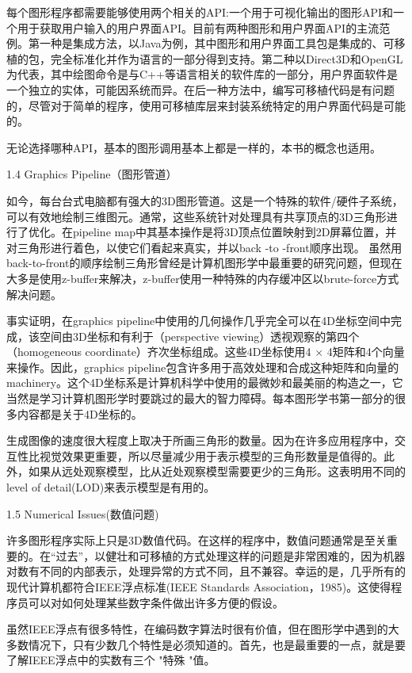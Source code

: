 每个图形程序都需要能够使用两个相关的API:一个用于可视化输出的图形API和一个用于获取用户输入的用户界面API。目前有两种图形和用户界面API的主流范例。第一种是集成方法，以Java为例，其中图形和用户界面工具包是集成的、可移植的包，完全标准化并作为语言的一部分得到支持。第二种以Direct3D和OpenGL为代表，其中绘图命令是与C++等语言相关的软件库的一部分，用户界面软件是一个独立的实体，可能因系统而异。在后一种方法中，编写可移植代码是有问题的，尽管对于简单的程序，使用可移植库层来封装系统特定的用户界面代码是可能的。

无论选择哪种API，基本的图形调用基本上都是一样的，本书的概念也适用。

1.4 Graphics Pipeline（图形管道）

如今，每台台式电脑都有强大的3D图形管道。这是一个特殊的软件/硬件子系统，可以有效地绘制三维图元。通常，这些系统针对处理具有共享顶点的3D三角形进行了优化。在pipeline map中其基本操作是将3D顶点位置映射到2D屏幕位置，并对三角形进行着色，以使它们看起来真实，并以back -to -front顺序出现。
虽然用back-to-front的顺序绘制三角形曾经是计算机图形学中最重要的研究问题，但现在大多是使用z-buffer来解决，z-buffer使用一种特殊的内存缓冲区以brute-force方式解决问题。

事实证明，在graphics pipeline中使用的几何操作几乎完全可以在4D坐标空间中完成，该空间由3D坐标和有利于（perspective viewing）透视观察的第四个（homogeneous coordinate）齐次坐标组成。这些4D坐标使用4 × 4矩阵和4个向量来操作。因此，graphics pipeline包含许多用于高效处理和合成这种矩阵和向量的machinery。这个4D坐标系是计算机科学中使用的最微妙和最美丽的构造之一，它当然是学习计算机图形学时要跳过的最大的智力障碍。每本图形学书第一部分的很多内容都是关于4D坐标的。

生成图像的速度很大程度上取决于所画三角形的数量。因为在许多应用程序中，交互性比视觉效果更重要，所以尽量减少用于表示模型的三角形数量是值得的。此外，如果从远处观察模型，比从近处观察模型需要更少的三角形。这表明用不同的level of detail(LOD)来表示模型是有用的。

1.5 Numerical Issues(数值问题)

许多图形程序实际上只是3D数值代码。在这样的程序中，数值问题通常是至关重要的。在“过去”，以健壮和可移植的方式处理这样的问题是非常困难的，因为机器对数有不同的内部表示，处理异常的方式不同，且不兼容。幸运的是，几乎所有的现代计算机都符合IEEE浮点标准(IEEE Standards Association，1985)。这使得程序员可以对如何处理某些数字条件做出许多方便的假设。

虽然IEEE浮点有很多特性，在编码数字算法时很有价值，但在图形学中遇到的大多数情况下，只有少数几个特性是必须知道的。首先，也是最重要的一点，就是要了解IEEE浮点中的实数有三个 "特殊 "值。

